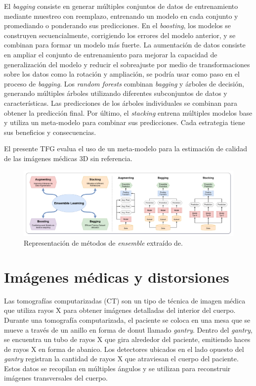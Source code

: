 El \emph{bagging} consiste en generar múltiples conjuntos de datos de entrenamiento 
mediante muestreo con reemplazo, entrenando un modelo en cada conjunto y 
promediando o ponderando sus predicciones. 
En el \emph{boosting}, los modelos se construyen secuencialmente, corrigiendo los errores 
del modelo anterior, y se combinan para formar un modelo más fuerte. 
La aumentación de datos consiste en ampliar el conjunto de entrenamiento para
mejorar la capacidad de generalización del modelo y reducir el sobreajuste por 
medio de transformaciones sobre los datos como la rotación y ampliación, 
se podría usar como paso en el proceso de \emph{bagging}.
Los \emph{random forests} combinan \emph{bagging} y árboles de decisión, 
generando múltiples árboles utilizando diferentes subconjuntos de datos y características. 
Las predicciones de los árboles individuales se combinan para obtener la predicción final.
Por último, el \emph{stacking} entrena múltiples modelos base y utiliza un meta-modelo 
para combinar sus predicciones. 
Cada estrategia tiene sus beneficios y consecuencias.

El presente TFG evalua el uso de un meta-modelo para la estimación de calidad de 
las imágenes médicas 3D sin referencia.

\begin{figure}[htp]
  \centering
  \includegraphics[width=\textwidth]{imagenes/chapter2/EnsembleExample.png}
  \caption{Representación de métodos de \emph{ensemble} extraído de\cite{MedicalEnsembleExample}.}
  \label{fig:EnsembleExample}
\end{figure}

\section{Imágenes médicas y distorsiones}
\label{sec:Distorsiones}
Las tomografías computarizadas (CT) son un tipo de técnica de imagen médica 
que utiliza rayos X para obtener imágenes detalladas del interior del cuerpo. 
Durante una tomografía computarizada, el paciente se coloca en una mesa que se 
mueve a través de un anillo en forma de donut llamado \emph{gantry}. Dentro del \emph{gantry},
se encuentra un tubo de rayos X que gira alrededor del paciente, emitiendo haces 
de rayos X en forma de abanico.
Los detectores ubicados en el lado opuesto del \emph{gantry} registran la cantidad de 
rayos X que atraviesan el cuerpo del paciente. Estos datos se recopilan en 
múltiples ángulos y se utilizan para reconstruir imágenes transversales del cuerpo. 

